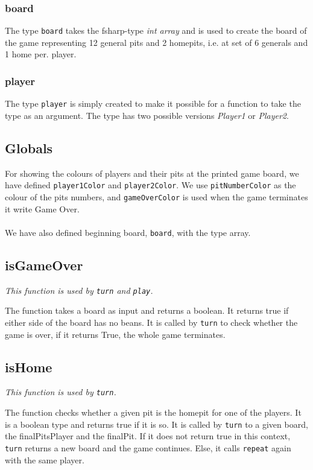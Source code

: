 \documentclass[a4paper]{report}
\begin{document}
\subsubsection*{board}
The type \texttt{board} takes the fsharp-type \textsl{int array} and is used to create the board of the game representing 12 general pits and 2 homepits, i.e. at set of 6 generals and 1 home per. player.

\subsubsection*{player}
The type \texttt{player} is simply created to make it possible for a function to take the type as an argument. The type has two possible versions \textsl{Player1} or \textsl{Player2}.

\subsection*{Globals}
For showing the colours of players and their pits at the printed game board, we have defined \texttt{player1Color} and \texttt{player2Color}. We use \texttt{pitNumberColor} as the colour of the pits numbers, and \texttt{gameOverColor} is used when the game terminates it write Game Over.
\\\\
We have also defined beginning board, \texttt{board}, with the type array.

\subsection*{isGameOver}
{\it This function is used by \texttt{turn} and \texttt{play}.}

The function takes a board as input and returns a boolean. It returns true if either side of the board has no beans. It is called by \texttt{turn} to check whether the game is over, if it returns True, the whole game terminates.

\subsection*{isHome}
{\it This function is used by \texttt{turn}.}

The function checks whether a given pit is the homepit for one of the players. It is a boolean type and returns true if it is so.
It is called by \texttt{turn} to a given board, the finalPitsPlayer and the finalPit. If it does not return true in this context, \texttt{turn} returns a new board and the game continues. Else, it calls \texttt{repeat} again with the same player.
\end{document}
